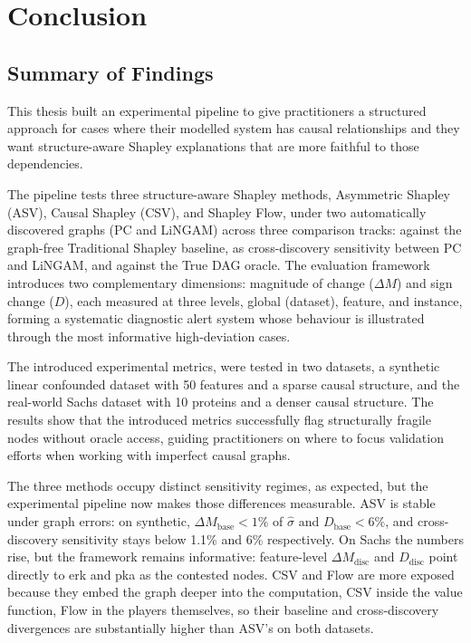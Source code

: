 \documentclass[12pt,a4paper,oneside]{article}
\begin{document}
\section{Conclusion}
\label{sec:conclusion}

\subsection{Summary of Findings}

This thesis built an experimental pipeline to give practitioners a structured approach for cases where their modelled system has causal relationships and they want structure-aware Shapley explanations that are more faithful to those dependencies.

The pipeline tests three structure-aware Shapley methods, Asymmetric Shapley (ASV), Causal Shapley (CSV), and Shapley Flow, under two automatically discovered graphs (PC and LiNGAM) across three comparison tracks: against the graph-free Traditional Shapley baseline, as cross-discovery sensitivity between PC and LiNGAM, and against the True DAG oracle. The evaluation framework introduces two complementary dimensions: magnitude of change ($\Delta M$) and sign change ($D$), each measured at three levels, global (dataset), feature, and instance, forming a systematic diagnostic alert system whose behaviour is illustrated through the most informative high-deviation cases.

The introduced experimental metrics, were tested in two datasets, a synthetic linear confounded dataset with 50 features and a sparse causal structure, and the real-world Sachs dataset with 10 proteins and a denser causal structure. The results show that the introduced metrics successfully flag structurally fragile nodes without oracle access, guiding practitioners on where to focus validation efforts when working with imperfect causal graphs.

The three methods occupy distinct sensitivity regimes, as expected, but the experimental pipeline
now makes those differences measurable. ASV is stable under graph errors: on synthetic,
$\Delta M_{\text{base}} < 1\%$ of $\hat{\sigma}$ and $D_{\text{base}} < 6\%$, and cross-discovery
sensitivity stays below 1.1\% and 6\% respectively. On Sachs the numbers rise, but the framework
remains informative: feature-level $\Delta M_{\text{disc}}$ and $D_{\text{disc}}$ point directly
to erk and pka as the contested nodes. CSV and Flow are more exposed
because they embed the graph deeper into the computation, CSV inside the value function,
Flow in the players themselves, so their baseline and cross-discovery divergences are
substantially higher than ASV's on both datasets.
\end{document}
